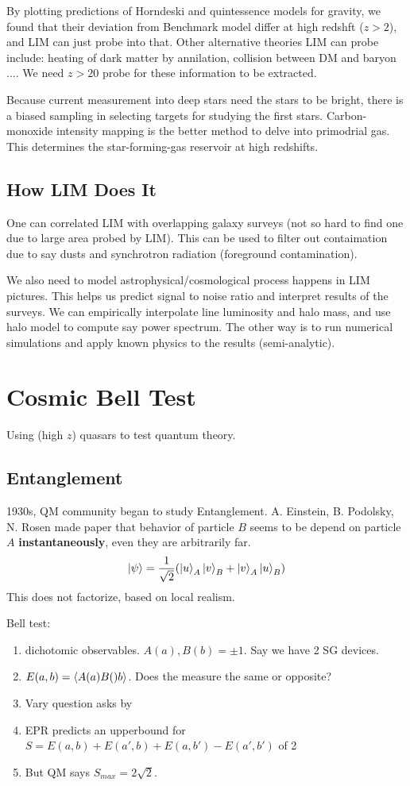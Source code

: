 \documentclass[11pt]{article}
\begin{document}
By plotting predictions of Horndeski and quintessence models for gravity, we found that their deviation from Benchmark model differ at high redshft ($z>2$), and LIM can just probe into that. 
Other alternative theories LIM can probe include: heating of dark matter by annilation, collision between DM and baryon $\ldots$.  We need $z>20$ probe for these information to be extracted. 

Because current measurement into deep stars need the stars to be bright, there is a biased sampling in selecting targets for studying the first stars. Carbon-monoxide intensity mapping is the better method to delve into primodrial gas. This determines the star-forming-gas reservoir at high redshifts. 

\subsection*{How LIM Does It}
One can correlated LIM with overlapping galaxy surveys (not so hard to find one due to large area probed by LIM). This can be used to filter out contaimation due to say dusts and synchrotron radiation (foreground contamination). 

We also need to model astrophysical/cosmological process happens in LIM pictures. This helps us predict signal to noise ratio and interpret results of the surveys. 
We can empirically interpolate line luminosity and halo mass, and use halo model to compute say power spectrum. The other way is to run numerical simulations and apply known physics to the results (semi-analytic). 

\section{Cosmic Bell Test}
Using (high $z$) quasars to test quantum theory. 
\subsection*{Entanglement} 
1930s, QM community began to study Entanglement. A. Einstein, B. Podolsky, N. Rosen made paper that behavior of particle $B$ seems to be depend on particle $A$ \textbf{instantaneously}, even they are arbitrarily far. 
\begin{equation}
    \ket{\psi} = \frac{1}{\sqrt{2}}(\ket{u}_A\ket{v}_B + \ket{v}_A\ket{u}_B)
\end{equation}
This does not factorize, based on local realism. 

Bell test:
\begin{enumerate}
    \item dichotomic observables. $A(a), B(b) = \pm 1$. Say we have 2 SG devices. 
    \item $E(a,b) = \braket{A(a)B()b}$. Does the measure the same or opposite? 
    \item Vary question asks by 
    \item EPR predicts an upperbound for $S = E(a,b) + E(a',b) + E(a, b') - E(a',b')$ of 2
    \item But QM says $S_{max} = 2\sqrt{2}$. 
\end{enumerate}
\end{document}
